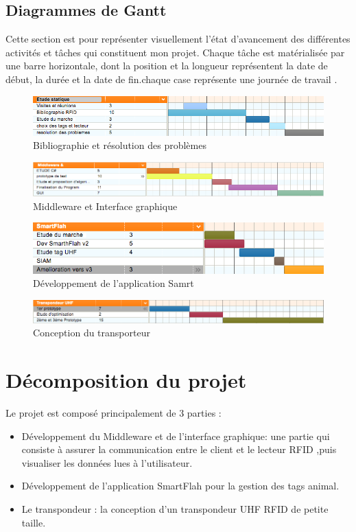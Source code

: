 \documentclass[11pt, a4paper, twoside]{book}
\begin{document}
\subsection{Diagrammes	de	Gantt}
Cette section est pour représenter visuellement l'état d'avancement des différentes activités et tâches qui constituent mon projet. Chaque tâche est matérialisée par une barre horizontale, dont la position et la longueur représentent la date de début, la durée et la date de fin.chaque case représente une journée de travail . 
\begin{figure}[H]
\centering
\includegraphics[width=\textwidth]{etudestatic}
\caption{Bibliographie et résolution des problèmes}

\end{figure}
\begin{figure}[H]
\centering
\includegraphics[width=\textwidth]{mid}
\caption{Middleware et Interface graphique}

\end{figure}
\begin{figure}[H]
\centering
\includegraphics[width=\textwidth]{smart}
\caption{Développement de l'application Samrt}

\end{figure}
\begin{figure}[H]
\centering
\includegraphics[width=\textwidth]{trans}
\caption{Conception du transporteur}

\end{figure}

\section{Décomposition du projet}
Le projet est composé principalement de 3 parties :
\begin{itemize}
\item Développement du Middleware et de l'interface graphique: une partie qui consiste à assurer la communication entre le client et le lecteur RFID ,puis visualiser les données lues à l'utilisateur.
\item Développement de l'application SmartFlah pour la gestion des tags animal.
\item Le transpondeur : la conception d'un transpondeur UHF RFID de petite taille.\\
\end{itemize}
\end{document}
